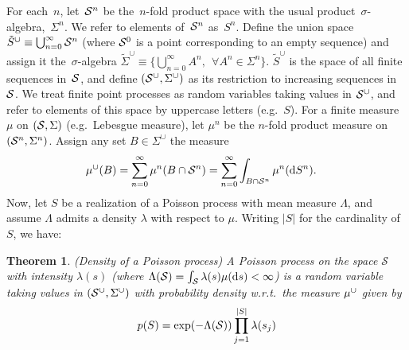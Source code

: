 \documentclass{statsoc}
\newtheorem{thrm}[defn]{Theorem}
\begin{document}
For each~$n$, let~${\mathcal S}^n$ be the~$n$-fold product space with the usual product~$\sigma$-algebra,~$\Sigma^n$. We refer
to elements of~${\mathcal S}^n$ as~$S^n$. %
Define the union space ${\tilde{S}^{\cup} \equiv \bigcup_{n=0}^{\infty} {\mathcal S}^n}$ (where 
${\mathcal S}^0$ is a point corresponding to an empty sequence) %
and assign it 
the~$\sigma$-algebra $\tilde{\Sigma}^{\cup} \equiv \{\bigcup_{n=0}^{\infty} A^n, \ \ \forall A^n \in \Sigma^n\}$. 
$\tilde{S}^{\cup}$ is the space of all finite sequences in~${\mathcal S}$, and define $(\mathcal{S}^{\cup}, \Sigma^{\cup})$ as its restriction to {increasing} sequences
in ${\mathcal S}$. We treat finite point processes as random variables taking values in $\mathcal{S}^{\cup}$, and refer to elements of this space
by uppercase letters (e.g.\ $S$). %
For a finite measure $\mu$ on $({\mathcal S},\Sigma)$ (e.g.\ Lebesgue measure), let $\mu^n$ be the $n$-fold product measure on~$({\mathcal S}^n, \Sigma^n)$.
Assign any set $B \in \Sigma^{\cup}$ the measure
\begin{align}
  \mu^{\cup}(B) &= \sum_{n=0}^{\infty} \mu^n(B \cap {\mathcal S}^n)
         = \sum_{n=0}^{\infty} \int_{B \cap {\mathcal S}^n}  \mu^n(\mathrm{d} S^n). \label{eq:base_measure1}
\end{align}
Now, let $S$ be a realization of a Poisson process with mean measure $\Lambda$, and assume $\Lambda$ %
admits a density $\lambda$ with respect to $\mu$. 
Writing $|S|$ for the cardinality of $S$, we have:
\begin{thrm} \emph{(Density of a Poisson process)} \label{thrm:poiss_density}
  A Poisson process on the space $\mathcal{S}$  with intensity $\lambda(s)$ (where $\Lambda({\mathcal S}) = \int_{{\mathcal S}} \lambda(s) \mu(\mathrm{d} s) < \infty$) is a random variable taking values in $(\mathcal{S}^{\cup}, \Sigma^{\cup})$ with 
probability 
density w.r.t.\ the measure $\mu^{\cup}$
given by 
\vspace{-.05in}
\begin{align}
  p(S) = \exp(-\Lambda({\mathcal S})) \prod_{j=1}^{|S|} \lambda(s_j)  \label{eq:poiss_prob}
\end{align}
\end{thrm}
\end{document}
